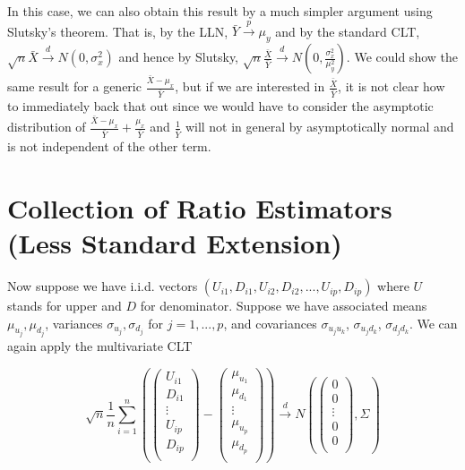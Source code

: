 \documentclass{article}
\theoremstyle{definition}
\begin{document}
In this case, we can also obtain this result by a much simpler argument using Slutsky's theorem. That is, by the LLN, $\bar{Y}\xrightarrow{p} \mu_y$ and by the standard CLT, $\sqrt{n}\bar{X} \xrightarrow{d} N(0,\sigma_x^2)$  and hence by Slutsky, $\sqrt{n}\frac{\bar{X}}{\bar{Y}} \xrightarrow{d} N(0,\frac{\sigma_x^2}{\mu_y^2})$. We could show the same result for a generic $\frac{\bar{X}-\mu_x}{\bar{Y}}$, but if we are interested in $\frac{\bar{X}}{\bar{Y}}$, it is not clear how to immediately back that out since we would have to consider the asymptotic distribution of $\frac{\bar{X}-\mu_x}{\bar{Y}} + \frac{\mu_x}{\bar{Y}}$ and $\frac{1}{\bar{Y}}$ will not in general by asymptotically normal and is not independent of the other term.



\newpage 
\section{Collection of Ratio Estimators (Less Standard Extension)}

Now suppose we have i.i.d. vectors $(U_{i1},D_{i1},U_{i2},D_{i2},...,U_{ip},D_{ip})$ where $U$ stands for upper and $D$ for denominator. Suppose we have associated means $\mu_{u_j},\mu_{d_j}$, variances $\sigma_{u_j},\sigma_{d_j}$ for $j=1,...,p$, and covariances $\sigma_{u_ju_k}$, $\sigma_{u_jd_k}$, $\sigma_{d_jd_k}$. We can again apply the multivariate CLT

\begin{equation*} \sqrt{n} \frac{1}{n}\sum_{i=1}^{n}
    \left(\left(\begin{array}{c}
        U_{i1}  \\
        D_{i1}  \\ 
        \vdots \\ 
        U_{ip}\\
        D_{ip}\\
    \end{array}\right) - \left(\begin{array}{c}
        \mu_{u_1}  \\
        \mu_{d_1}  \\ 
        \vdots \\ 
        \mu_{u_p}  \\
        \mu_{d_p}  \\ 
    \end{array}\right)\right) \xrightarrow{d}
    N\left(\left(\begin{array}{c}
        0  \\
        0  \\
        \vdots \\
        0  \\
        0  \\
    \end{array}\right),\Sigma \right)
\end{equation*}
\end{document}
